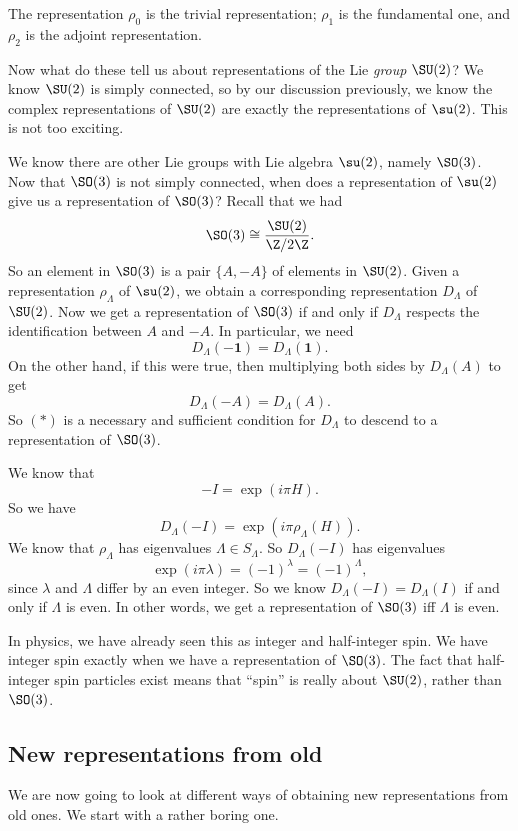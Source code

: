 \documentclass[a4paper]{article}
\begin{document}
The representation $\rho_0$ is the trivial representation; $\rho_1$ is the fundamental one, and $\rho_2$ is the adjoint representation.

Now what do these tell us about representations of the Lie \emph{group} $\SU(2)$? We know $\SU(2)$ is simply connected, so by our discussion previously, we know the complex representations of $\SU(2)$ are exactly the representations of $\su(2)$. This is not too exciting.

We know there are other Lie groups with Lie algebra $\su(2)$, namely $\SO(3)$. Now that $\SO(3)$ is not simply connected, when does a representation of $\su(2)$ give us a representation of $\SO(3)$? Recall that we had
\[
  \SO(3) \cong \frac{\SU(2)}{\Z/2\Z}.
\]
So an element in $\SO(3)$ is a pair $\{A, -A\}$ of elements in $\SU(2)$. Given a representation $\rho_\Lambda$ of $\su(2)$, we obtain a corresponding representation $D_\Lambda$ of $\SU(2)$. Now we get a representation of $\SO(3)$ if and only if $D_\Lambda$ respects the identification between $A$ and $-A$. In particular, we need
\[
  D_\Lambda(-\mathbf{1}) = D_\Lambda(\mathbf{1}).\tag{$*$}
\]
On the other hand, if this were true, then multiplying both sides by $D_\Lambda(A)$ to get
\[
  D_\Lambda(-A) = D_\Lambda(A).
\]
So $(*)$ is a necessary and sufficient condition for $D_\Lambda$ to descend to a representation of $\SO(3)$.

We know that
\[
  -I = \exp(i\pi H).
\]
So we have
\[
  D_\Lambda(-I) = \exp(i\pi \rho_\Lambda(H)).
\]
We know that $\rho_\Lambda$ has eigenvalues $\Lambda \in S_\Lambda$. So $D_\Lambda(-I)$ has eigenvalues
\[
  \exp(i\pi\lambda) = (-1)^\lambda = (-1)^\Lambda,
\]
since $\lambda$ and $\Lambda$ differ by an even integer. So we know $D_\Lambda(-I) = D_\Lambda (I)$ if and only if $\Lambda$ is even. In other words, we get a representation of $\SO(3)$ iff $\Lambda$ is even.

In physics, we have already seen this as integer and half-integer spin. We have integer spin exactly when we have a representation of $\SO(3)$. The fact that half-integer spin particles exist means that ``spin'' is really about $\SU(2)$, rather than $\SO(3)$.

\subsection{New representations from old}
We are now going to look at different ways of obtaining new representations from old ones. We start with a rather boring one.
\end{document}
